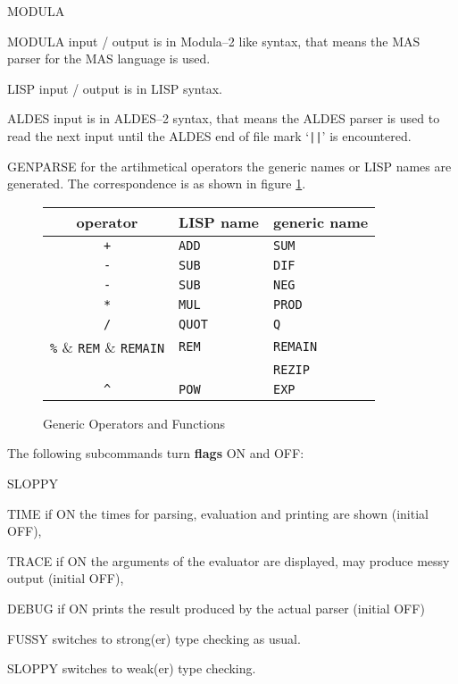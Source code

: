 \begin{deflist}{MODULA}
\item[MODULA\index{MODULA}] input / output is in Modula--2 like 
      syntax, 
      that means the MAS parser for the MAS language is used. 
\item[LISP\index{LISP}] input / output is in LISP syntax. 
\item[ALDES\index{ALDES}] input is in ALDES--2 syntax, 
      that means the ALDES parser is used to read 
      the next input until the ALDES end of file mark `\verb/||/'  
      is encountered.   
\item[GENPARSE\index{GENPARSE}] for the artihmetical operators 
      the generic names or LISP names are generated. The 
      correspondence is as shown in figure \ref{gen.fig}.
\end{deflist}
\begin{figure}[thbp] %
\begin{center}
\begin{tabular}{|c|l|l|} 
      \hline
      operator &  LISP name  & generic name \\
      \hline
      \verb/+/ &  \verb/ADD/  & \verb/SUM/ \\
      \verb/-/ &  \verb/SUB/  & \verb/DIF/ \\
      \verb/-/ &  \verb/SUB/  & \verb/NEG/ \\
      \verb/*/ &  \verb/MUL/  & \verb/PROD/ \\
      \verb./. &  \verb/QUOT/ & \verb/Q/ \\
      \verb.%. &  \verb/REM/  & \verb/REMAIN/ \\
               &              & \verb/REZIP/ \\
      \verb.^. &  \verb/POW/  & \verb/EXP/ \\
      \hline
\end{tabular}
\end{center}
\caption{Generic Operators and Functions}
\label{gen.fig}
\end{figure} %

The following subcommands turn {\bf flags} ON and OFF:

\begin{deflist}{SLOPPY}
\item[TIME\index{TIME}] if ON the times for 
     parsing, evaluation and printing are shown 
     (initial OFF), 
\item[TRACE\index{TRACE}] if ON the arguments of the evaluator 
      are displayed, may produce messy output 
     (initial OFF),  
\item[DEBUG\index{DEBUG}] if ON prints the result produced 
      by the actual parser 
     (initial OFF)
\item[FUSSY\index{FUSSY}] switches to strong(er) 
      type checking as usual.
\item[SLOPPY\index{SLOPPY}] switches to weak(er) 
      type checking.
\end{deflist}

